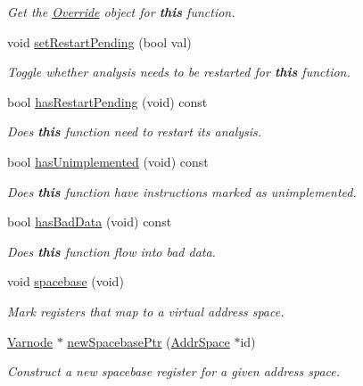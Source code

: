 \begin{DoxyCompactItemize}
\begin{DoxyCompactList}\small\item\em Get the \mbox{\hyperlink{class_override}{Override}} object for {\bfseries{this}} function. \end{DoxyCompactList}\item 
void \mbox{\hyperlink{class_funcdata_af21c852eb9f606c5cd19fb2456927ecd}{set\+Restart\+Pending}} (bool val)
\begin{DoxyCompactList}\small\item\em Toggle whether analysis needs to be restarted for {\bfseries{this}} function. \end{DoxyCompactList}\item 
bool \mbox{\hyperlink{class_funcdata_ae349f4a44febd9dd27ca63f7f8840103}{has\+Restart\+Pending}} (void) const
\begin{DoxyCompactList}\small\item\em Does {\bfseries{this}} function need to restart its analysis. \end{DoxyCompactList}\item 
bool \mbox{\hyperlink{class_funcdata_afef27da9040d28296accaaa1c1982401}{has\+Unimplemented}} (void) const
\begin{DoxyCompactList}\small\item\em Does {\bfseries{this}} function have instructions marked as {\itshape unimplemented}. \end{DoxyCompactList}\item 
bool \mbox{\hyperlink{class_funcdata_a4d1556d4d7cd4c30e0f8b009fc90a50e}{has\+Bad\+Data}} (void) const
\begin{DoxyCompactList}\small\item\em Does {\bfseries{this}} function flow into bad data. \end{DoxyCompactList}\item 
void \mbox{\hyperlink{class_funcdata_a96433773ee0126ce9a25b0970a6ef513}{spacebase}} (void)
\begin{DoxyCompactList}\small\item\em Mark registers that map to a virtual address space. \end{DoxyCompactList}\item 
\mbox{\hyperlink{class_varnode}{Varnode}} $\ast$ \mbox{\hyperlink{class_funcdata_ac083b7d6637a5883ef8cbd38e7756837}{new\+Spacebase\+Ptr}} (\mbox{\hyperlink{class_addr_space}{Addr\+Space}} $\ast$id)
\begin{DoxyCompactList}\small\item\em Construct a new {\itshape spacebase} register for a given address space. \end{DoxyCompactList}\item 

\end{DoxyCompactItemize}
